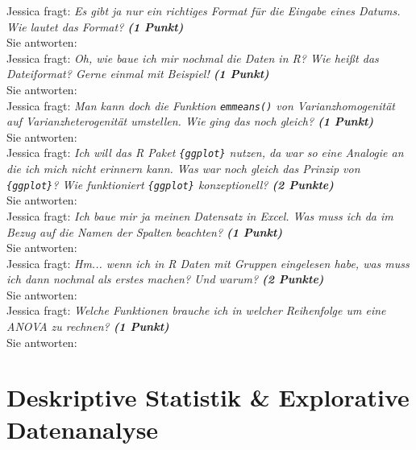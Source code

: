 \documentclass[a4paper, 9pt]{scrartcl}\usepackage[]{graphicx}\usepackage[]{xcolor}
\begin{document}
Jessica fragt: \textit{Es gibt ja nur ein richtiges Format für die Eingabe eines Datums. Wie lautet das Format? \textbf{(1 Punkt)}}\\[1ex]
Sie antworten:\\[7Ex]

Jessica fragt: \textit{Oh, wie baue ich mir nochmal die Daten in R? Wie heißt das Dateiformat? Gerne einmal mit Beispiel! \textbf{(1 Punkt)}}\\[1ex]
Sie antworten:\\[7Ex]

Jessica fragt: \textit{Man kann doch die Funktion \texttt{emmeans()} von Varianzhomogenität auf Varianzheterogenität umstellen. Wie ging das noch gleich? \textbf{(1 Punkt)}}\\[1ex]
Sie antworten:\\[7Ex]

Jessica fragt: \textit{Ich will das R Paket \texttt{\{ggplot\}} nutzen, da war so eine Analogie an die ich mich nicht erinnern kann. Was war noch gleich das Prinzip von \texttt{\{ggplot\}}? Wie funktioniert \texttt{\{ggplot\}} konzeptionell? \textbf{(2 Punkte)}}\\[1ex]
Sie antworten:\\[7Ex]

Jessica fragt: \textit{Ich baue mir ja meinen Datensatz in Excel. Was muss ich da im Bezug auf die Namen der Spalten beachten? \textbf{(1 Punkt)}}\\[1ex]
Sie antworten:\\[7Ex]

Jessica fragt: \textit{Hm... wenn ich in R Daten mit Gruppen eingelesen habe, was muss ich dann nochmal als erstes machen? Und warum? \textbf{(2 Punkte)}}\\[1ex]
Sie antworten:\\[7Ex]

Jessica fragt: \textit{Welche Funktionen brauche ich in welcher Reihenfolge um eine ANOVA zu rechnen? \textbf{(1 Punkt)}}\\[1ex]
Sie antworten:\\[7Ex]



 
\clearpage
\part{Deskriptive Statistik \& Explorative Datenanalyse}
\end{document}

